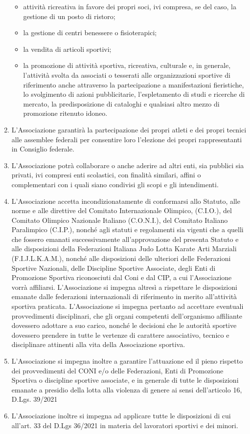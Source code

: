 \documentclass{djtsasddoc}
\begin{document}
\begin{enumerate}
\begin{itemize}
			\item attività ricreativa in favore dei propri soci, ivi compresa, se del caso, la gestione di un posto di ristoro;
			\item la gestione di centri benessere o fisioterapici;
			\item la vendita di articoli sportivi;
			\item la promozione di attività sportiva, ricreativa, culturale e, in generale, l'attività svolta da associati o tesserati alle organizzazioni sportive di riferimento anche attraverso la partecipazione a manifestazioni fieristiche, lo svolgimento di azioni pubblicitarie, l'espletamento di studi e ricerche di mercato, la predisposizione di cataloghi e qualsiasi altro mezzo di promozione ritenuto idoneo.
		\end{itemize}
		\item L'Associazione garantirà la partecipazione dei propri atleti e dei propri tecnici alle assemblee federali per consentire loro l'elezione dei propri rappresentanti in Consiglio federale.
		\item L'Associazione potrà collaborare o anche aderire ad altri enti, sia pubblici sia privati, ivi compresi enti scolastici, con finalità similari, affini o complementari con i quali siano condivisi gli scopi e gli intendimenti.
		\item L'Associazione accetta incondizionatamente di conformarsi allo Statuto, alle norme e alle direttive del Comitato Internazionale Olimpico, (C.I.O.), del Comitato Olimpico Nazionale Italiano (C.O.N.I.), del Comitato Italiano Paralimpico (C.I.P.), nonché agli statuti e regolamenti sia vigenti che a quelli che fossero emanati successivamente all'approvazione del presenta Statuto e alle disposizioni della  Federazioni Italiana Judo Lotta Karate Arti Marziali (F.I.J.L.K.A.M.), nonché alle disposizioni delle ulteriori delle Federazioni Sportive Nazionali,  delle Discipline Sportive Associate, degli Enti di Promozione Sportiva riconosciuti dal Coni e dal CIP, a cui l'Associazione vorrà affiliarsi. L'Associazione si impegna altresì a rispettare le disposizioni emanate dalle federazioni internazionali di riferimento in merito all'attività sportiva praticata. L'Associazione si impegna pertanto ad accettare eventuali provvedimenti disciplinari, che gli organi competenti dell'organismo affiliante  dovessero adottare a suo carico, nonché le decisioni che le autorità sportive dovessero prendere in tutte le vertenze di carattere associativo, tecnico e disciplinare attinenti alla vita della Associazione sportiva.
		\item L'Associazione si impegna inoltre a garantire l'attuazione ed il pieno rispetto dei provvedimenti del CONI e/o delle Federazioni, Enti di Promozione Sportiva o discipline sportive associate, e in generale di tutte le disposizioni emanate a presidio della lotta alla violenza di genere ai sensi dell'articolo 16, D.Lgs. 39/2021
		\item L'Associazione inoltre si impegna ad applicare tutte le disposizioni di cui all'art. 33 del D.Lgs 36/2021  in materia del lavoratori sportivi e dei minori.
	\end{enumerate}
	
\end{document}
